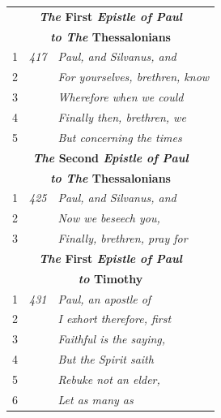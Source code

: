\documentclass{article}
\newlength{\minipageheight}
\begin{document}
\begin{minipage}[r][\minipageheight][t]{3.3in}
\begin{longtable}{ccl}
        \multicolumn{3}{c}{\textbf{\textit{The} First \textit{Epistle of Paul}}}  \\
        \multicolumn{3}{c}{\textbf{\textit{to The} Thessalonians}}                \\
        \hline
        1           & \textit{417} & \textit{Paul, and Silvanus, and}             \\
        2           &              & \textit{For yourselves, brethren, know}      \\
        3           &              & \textit{Wherefore when we could}             \\
        4           &              & \textit{Finally then, brethren, we}          \\
        5           &              & \textit{But concerning the times}            \\

        \multicolumn{3}{c}{\textbf{\textit{The} Second \textit{Epistle of Paul}}} \\
        \multicolumn{3}{c}{\textbf{\textit{to The} Thessalonians}}                \\
        \hline
        1           & \textit{425} & \textit{Paul, and Silvanus, and}             \\
        2           &              & \textit{Now we beseech you,}                 \\
        3           &              & \textit{Finally, brethren, pray for}         \\

        \multicolumn{3}{c}{\textbf{\textit{The} First \textit{Epistle of Paul}}}  \\
        \multicolumn{3}{c}{\textbf{\textit{to} Timothy}}                          \\
        \hline
        1           & \textit{431} & \textit{Paul, an apostle of}                 \\
        2           &              & \textit{I exhort therefore, first}           \\
        3           &              & \textit{Faithful is the saying,}             \\
        4           &              & \textit{But the Spirit saith}                \\
        5           &              & \textit{Rebuke not an elder,}                \\
        6           &              & \textit{Let as many as}                      \\


\end{longtable}
\end{minipage}
\end{document}
